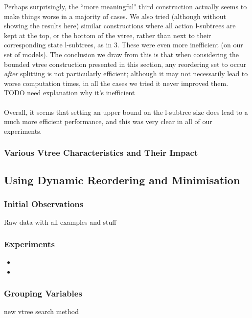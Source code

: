 \documentclass[11pt]{article}
\begin{document}
Perhaps surprisingly, the ``more meaningful" third construction actually seems to make things worse in a majority of cases. We also tried (although without showing the results here) similar constructions where all action l-subtrees are kept at the top, or the bottom of the vtree, rather than next to their corresponding state l-subtrees, as in 3. These were even more inefficient (on our set of models).
 The conclusion we draw from this is that when considering the bounded vtree construction presented in this section, any reordering set to occur \textit{after} splitting is not particularly efficient; although it may not necessarily lead to worse computation times, in all the cases we tried it never improved them. TODO need explanation why it's inefficient
 \\\\
Overall, it seems that setting an upper bound on the l-subtree size does lead to a much more efficient performance, and this was very clear in all of our experiments. 	

 
\subsubsection{Various Vtree Characteristics and Their Impact}



\subsection{Using Dynamic Reordering and Minimisation}

\subsubsection{Initial Observations}

Raw data with all examples and stuff 

\subsubsection{Experiments}

\begin{itemize}
\item 
\item 
\end{itemize}

\subsubsection{Grouping Variables}
new vtree search method 
\end{document}

